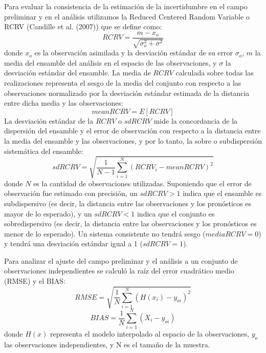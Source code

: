 \documentclass[12pt,oneside,a4paper]{reedthesis}
\begin{document}
Para evaluar la consistencia de la estimación de la incertidumbre en el campo preliminar y en el análisis utilizamos la Reduced Centered Random Variable o RCRV (Candille et al. (2007)) que se define como:
\begin{equation}
\mathit{RCRV} = \frac{m - x_o}{\sqrt{\sigma_o^2 + \sigma^2}}
\label{eq:eq6}
\end{equation}
donde \(x_o\) es la observación asimilada y la desviación estándar de su error \(\sigma_o\), \(m\) la media del ensamble del análisis en el espacio de las observaciones, y \(\sigma\) la desviación estándar del ensamble.
La media de \(RCRV\) calculada sobre todas las realizaciones representa el sesgo de la media del conjunto con respecto a las observaciones normalizado por la desviación estándar estimada de la distancia entre dicha media y las observaciones:
\begin{equation}
\mathit{mean RCRV} = E[RCRV]
\label{eq:eq7}
\end{equation}
La desviación estándar de la \(RCRV\) o \(sd RCRV\) mide la concordancia de la dispersión del ensamble y el error de observación con respecto a la distancia entre la media del ensamble y las observaciones, y por lo tanto, la sobre o subdispersión sistemática del ensamble:
\begin{equation}
\mathit{sd RCRV} = \sqrt{\frac{1}{N -1}\sum_{i=1}^{N}(RCRV_i - \mathit{mean RCRV})^2}
\label{eq:eq8}
\end{equation}
donde \(N\) es la cantidad de observaciones utilizadas. Suponiendo que el error de observación fue estimado con precisión, un \(sd RCRV > 1\) indica que el ensamble es subdispersivo (es decir, la distancia entre las observaciones y los pronósticos es mayor de lo esperado), y un \(sd RCRV < 1\) indica que el conjunto es sobredispersivo (es decir, la distancia entre las observaciones y los pronósticos es menor de lo esperado). Un sistema consistente no tendrá sesgo (\(media RCRV = 0\)) y tendrá una desviación estándar igual a 1 (\(sd RCRV = 1\)).

Para analizar el ajuste del campo preliminar y el análisis a un conjunto de observaciones independientes se calculó la raíz del error cuadrático medio (RMSE) y el BIAS:
\begin{equation}
\mathit{RMSE} = \sqrt{\frac{1}{N}\sum_{i = 1}^{N} (H(x_i) - y_{oi})^{2}}
\label{eq:eq9}
\end{equation}
\begin{equation}
\mathit{BIAS} = \frac{1}{N}\sum_{i = 1}^{N} (X_i - y_{oi})
\label{eq:eq10}
\end{equation}
donde \(H(x)\) representa el modelo interpolado al espacio de la observaciones, \(y_{o}\) las observaciones independientes, y N es el tamaño de la muestra.
\end{document}
